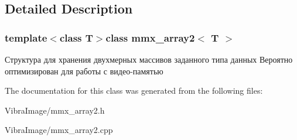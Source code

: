 \subsection{Detailed Description}
\subsubsection*{template$<$class T$>$class mmx\+\_\+array2$<$ T $>$}

Структура для хранения двухмерных массивов заданного типа данных Вероятно оптимизирован для работы с видео-\/памятью 



The documentation for this class was generated from the following files\+:\begin{DoxyCompactItemize}
\item 
Vibra\+Image/mmx\+\_\+array2.\+h\item 
Vibra\+Image/mmx\+\_\+array2.\+cpp\end{DoxyCompactItemize}
